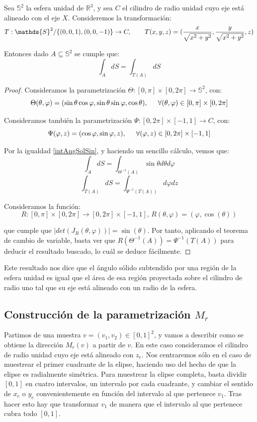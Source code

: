 \begin{proposicion}
Sea $\mathds{S}^2$ la esfera unidad de $\mathds{R}^3$, y sea $C$ el cilindro de radio unidad cuyo eje está alineado con el eje $X$. Consideremos la transformación:
$$T:\mathds{S}^2/\{(0,0,1),(0,0,-1)\}\rightarrow C, \hspace{0.7cm} T(x,y,z) = (\frac{x}{\sqrt{x^2+y^2}}, \frac{y}{\sqrt{x^2+y^2}}, z)$$

Entonces dado $A\subseteq\mathds{S}^2$ se cumple que:
$$\int_A dS = \int_{T(A)} dS$$
\end{proposicion}
\begin{proof}
Consideramos la parametrización $\Theta:[0,\pi ]\times [0,2\pi ]\rightarrow \mathds{S}^2$, con:
$$\Theta(\theta ,\varphi ) = ( \sin \theta \cos \varphi,  \sin \theta \sin \varphi , \cos \theta),\hspace{0.5cm}  \forall (\theta , \varphi)\in [0,\pi ]\times [0,2\pi ]$$

Consideramos también la parametrización $\Psi:[0,2\pi ]\times [-1,1]\rightarrow C$, con:
$$\Psi(\varphi , z ) = (\cos \varphi,  \sin \varphi , z),\hspace{0.5cm}  \forall (\varphi, z)\in [0,2\pi ]\times [-1,1]$$

Por la igualdad \ref{intAngSolSin}, y haciendo un sencillo cálculo, vemos que:
$$\int_A dS = \int_{\Theta^{-1}(A)} \sin\theta d\theta d\varphi$$
$$\int_{T(A)} dS = \int_{\Psi^{-1}(T(A))} d\varphi dz $$

Consideramos la función:
$$R:[0,\pi]\times [0,2\pi]\rightarrow [0,2\pi]\times [-1,1] \text{, } R(\theta,\varphi) = (\varphi, \cos(\theta))$$

que cumple que $|det(J_R(\theta,\varphi))| = \sin(\theta)$. Por tanto, aplicando el teorema de cambio de variable, basta ver que $R(\Theta^{-1}(A)) = \Psi^{-1}(T(A))$ para deducir el resultado buscado, lo cuál se deduce fácilmente.
\end{proof}

Este resultado nos dice que el ángulo sólido subtendido por una región de la esfera unidad es igual que el área de esa región proyectada sobre el cilindro de radio uno tal que su eje está alineado con un radio de la esfera.

\subsection{Construcción de la parametrización $M_r$}
Partimos de una muestra $v=(v_1,v_2)\in[0,1]^2$, y vamos a describir como se obtiene la dirección $M_r(v)$ a partir de $v$. En este caso consideramos el cilindro de radio unidad cuyo eje está alineado con $z_e$. Nos centraremos sólo en el caso de muestrear el primer cuadrante de la elipse, haciendo uso del hecho de que la elipse es radialmente simétrica. Para muestrear la elipse completa, basta dividir $[0,1]$ en cuatro intervalos, un intervalo por cada cuadrante, y cambiar el sentido de $x_e$ o $y_e$ convenientemente en función del intervalo al que pertenece $v_1$. Tras hacer esto hay que transformar $v_1$ de manera que el intervalo al que pertenece cubra todo $[0,1]$.

